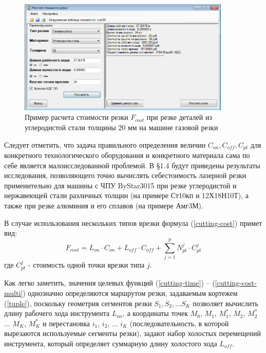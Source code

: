 \documentclass[12pt,twoside]{report}
\begin{document}
\begin{figure}
  \begin{center}
  \includegraphics[width=0.9\textwidth]{cost.png}
  \caption{Пример расчета стоимости резки $F_{cost}$ при резке деталей из углеродистой стали толщины 20 мм на машине газовой резки}
  \label{cost}
  \end{center}
\end{figure}

Следует отметить,
что задача правильного определения величин
$C_{on}, C_{off}, C_{pt}$
для конкретного технологического оборудования
и конкретного материала сама по себе является малоисследованной проблемой.
В \S 1.4
будут приведены результаты исследования,
позволяющего точно вычислять себестоимость
лазерной резки применительно для машины с ЧПУ
ByStar3015 при резке углеродистой и нержавеющей
стали различных толщин
(на примере Ст10кп и 12Х18Н10Т),
а также при резке алюминия и его сплавов (на примере Амг3М).

В случае использования нескольких типов врезки формула (\ref{cutting-cost}) примет вид:
\begin{equation}
  F_{cost}=
  L_{on} \cdot C_{on} +
  L_{off} \cdot C_{off} +
  \sum_{j=1}^p N_{pt}^j \cdot C_{pt}^j
  \label{cutting-cost-multi}
\end{equation}
где $C_{pt}^j$ - стоимость одной точки врезки типа $j$.

Как легко заметить,
значения целевых функций (\ref{cutting-time}) – (\ref{cutting-cost-multi})
однозначно определяются маршрутом резки, задаваемым кортежем (\ref{tuple}),
поскольку геометрия сегментов резки
$S_1, S_2, \dots S_K$
позволяет вычислить длину рабочего хода инструмента  $L_{on}$,
а координаты точек
$M_0$, $M_1$, $M_1^*$, $M_2$, $M_2^*$ ... $M_K$, $M_K^*$
и перестановка
$i_1$, $i_2$, ... $i_K$
(последовательность, в которой вырезаются используемые сегменты резки),
задают набор холостых перемещений инструмента,
который определяет суммарную длину холостого хода  $L_{off}$.
\end{document}
